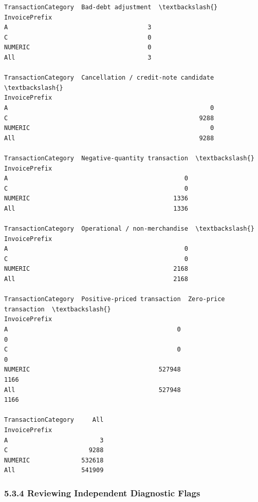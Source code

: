 \documentclass[11pt]{article}
\begin{document}
    
    \begin{Verbatim}[commandchars=\\\{\}]
TransactionCategory  Bad-debt adjustment  \textbackslash{}
InvoicePrefix                              
A                                      3   
C                                      0   
NUMERIC                                0   
All                                    3   

TransactionCategory  Cancellation / credit-note candidate  \textbackslash{}
InvoicePrefix                                               
A                                                       0   
C                                                    9288   
NUMERIC                                                 0   
All                                                  9288   

TransactionCategory  Negative-quantity transaction  \textbackslash{}
InvoicePrefix                                        
A                                                0   
C                                                0   
NUMERIC                                       1336   
All                                           1336   

TransactionCategory  Operational / non-merchandise  \textbackslash{}
InvoicePrefix                                        
A                                                0   
C                                                0   
NUMERIC                                       2168   
All                                           2168   

TransactionCategory  Positive-priced transaction  Zero-price transaction  \textbackslash{}
InvoicePrefix                                                              
A                                              0                       0   
C                                              0                       0   
NUMERIC                                   527948                    1166   
All                                       527948                    1166   

TransactionCategory     All  
InvoicePrefix                
A                         3  
C                      9288  
NUMERIC              532618  
All                  541909  
    \end{Verbatim}

    
    \subsubsection{5.3.4 Reviewing Independent Diagnostic
Flags}\label{reviewing-independent-diagnostic-flags}
\end{document}
